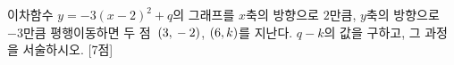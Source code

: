 이차함수 $y=-3(x-2)^2+q$의 그래프를 $x$축의 방향으로 $2$만큼, $y$축의 방향으로 $-3$만큼 평행이동하면 두 점~$(3{,}\mkern3mu -2)$, $(6{,}\mkern3mu k)$를 지난다. $q-k$의 값을 구하고, 그 과정을 서술하시오.  \mbox{[7점]}
